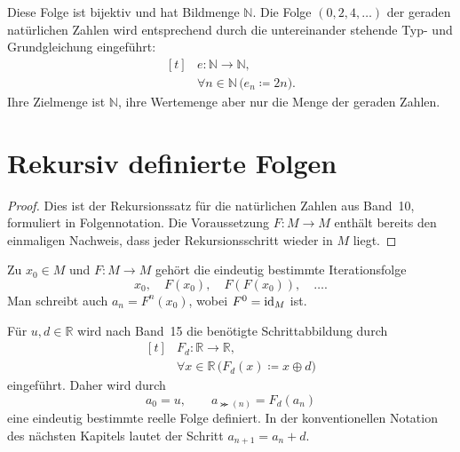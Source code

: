 \documentclass[main.tex]{subfiles}
\providecommand{\RealAdd}{\mathbin{\oplus}}
\begin{document}

Diese Folge ist bijektiv und hat Bildmenge \(\mathbb N\). Die Folge
\((0,2,4,\ldots)\) der geraden natürlichen Zahlen wird entsprechend durch
die untereinander stehende Typ- und Grundgleichung eingeführt:
\[
  \begin{aligned}[t]
    &e\colon\mathbb N\to\mathbb N,\\[-2pt]
    &\forall n\in\mathbb N\,\bigl(e_n\coloneqq 2n\bigr).
  \end{aligned}
\]
Ihre Zielmenge ist \(\mathbb N\), ihre Wertemenge aber nur die Menge der
geraden Zahlen.

\section{Rekursiv definierte Folgen}

\begin{proof}
Dies ist der Rekursionssatz für die natürlichen Zahlen aus Band~10,
formuliert in Folgennotation. Die Voraussetzung \(F\colon M\to M\) enthält
bereits den einmaligen Nachweis, dass jeder Rekursionsschritt wieder in
\(M\) liegt.
\end{proof}

\begin{example}[Iteration]
Zu \(x_0\in M\) und \(F\colon M\to M\) gehört die eindeutig bestimmte
Iterationsfolge
\[
  x_0,\quad F(x_0),\quad F(F(x_0)),\quad\ldots.
\]
Man schreibt auch \(a_n=F^n(x_0)\), wobei \(F^0=\mathrm{id}_M\) ist.
\end{example}

\begin{example}
Für \(u,d\in\mathbb R\) wird nach Band~15 die benötigte Schrittabbildung
durch
\[
  \begin{aligned}[t]
    &F_d\colon\mathbb R\to\mathbb R,\\[-2pt]
    &\forall x\in\mathbb R\,
      \bigl(F_d(x)\coloneqq x\RealAdd d\bigr)
  \end{aligned}
\]
eingeführt. Daher wird durch
\[
  a_0=u,
  \qquad a_{\Succ(n)}=F_d(a_n)
\]
eine eindeutig bestimmte reelle Folge definiert. In der konventionellen
Notation des nächsten Kapitels lautet der Schritt \(a_{n+1}=a_n+d\).
\end{example}
\end{document}
